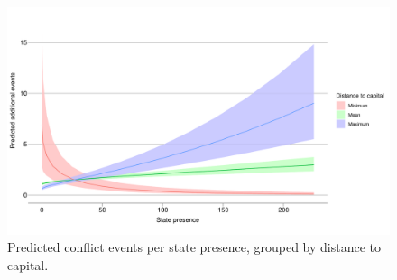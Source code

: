 \documentclass[12pt]{article}
\begin{document}
\begin{figure}[htpb]
	\centering
	\includegraphics[width=\linewidth]{"../R/Output/SBzinbplot.pdf"}
	\caption{Predicted conflict events per state presence, grouped by
	distance to capital.}
	\label{state_int}
\end{figure}
\end{document}
